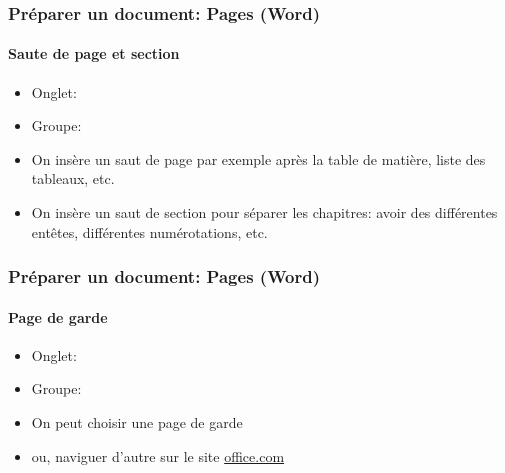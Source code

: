 \documentclass[xcolor=table]{beamer}
\begin{document}
\begin{frame}[t]
\frametitle{Préparer un document: Pages (Word)}
\framesubtitle{Saute de page et section}

\begin{minipage}{0.44\textwidth}
	\begin{itemize}
		\item Onglet: 
		\item Groupe: 
		\item On insère un saut de page par exemple après la table de matière, liste des tableaux, etc.
		\item On insère un saut de section pour séparer les chapitres: avoir des différentes entêtes, différentes numérotations, etc.
	\end{itemize}
\end{minipage}
\begin{minipage}{0.55\textwidth}
\end{minipage}

\end{frame}

\begin{frame}[t]
\frametitle{Préparer un document: Pages (Word)}
\framesubtitle{Page de garde}

\begin{minipage}{0.49\textwidth}
	\begin{itemize}
		\item Onglet: 
		\item Groupe: 
		\item On peut choisir une page de garde
		\item ou, naviguer d'autre sur le site \url{office.com}
	\end{itemize}
\end{minipage}
\begin{minipage}{0.50\textwidth}
\end{minipage}

\end{frame}
\end{document}
